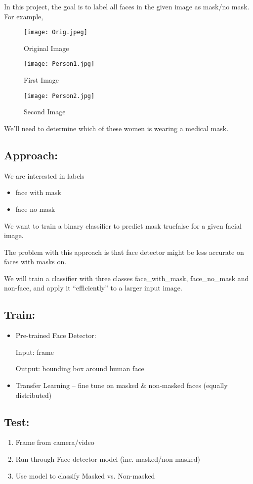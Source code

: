 In this project, the goal is to label all faces in the given image as mask/no mask. For example,

\begin{figure}[H]
    \centering
    \texttt{[image: Orig.jpeg]}
    \caption{Original Image}
    \label{fig:Orig}
\end{figure}

\begin{figure}[H]
    \centering
    \texttt{[image: Person1.jpg]}
    \caption{First Image}
    \label{fig:First}
\end{figure}

\begin{figure}[H]
    \centering
    \texttt{[image: Person2.jpg]}
    \caption{Second Image}
    \label{fig:Second}
\end{figure}

We'll need to determine which of these women is wearing a medical mask.

\subsection{Approach:}
We are interested in labels
\begin{itemize}
    \item face with mask
    \item face no mask
\end{itemize}

We want to train a binary classifier to predict mask true\/false for a given facial image.


The problem with this approach is that face detector might be less accurate on faces with masks on.


We will train a classifier with three classes face\_with\_mask, face\_no\_mask and non-face, and apply it “efficiently” to a larger input image.


\subsection{Train:}
\begin{itemize}
    \item Pre-trained Face Detector:

        Input: frame

	    Output: bounding box around human face
    \item Transfer Learning – fine tune on masked \& non-masked faces (equally distributed)
\end{itemize}


\subsection{Test:}
\begin{enumerate}
    \item Frame from camera/video
    \item Run through Face detector model (inc. masked/non-masked)
    \item Use model to classify Masked  vs. Non-masked
\end{enumerate}


